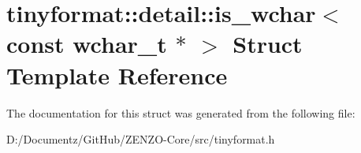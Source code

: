 \hypertarget{structtinyformat_1_1detail_1_1is__wchar_3_01const_01wchar__t_01_5_01_4}{}\section{tinyformat\+::detail\+::is\+\_\+wchar$<$ const wchar\+\_\+t $\ast$ $>$ Struct Template Reference}
\label{structtinyformat_1_1detail_1_1is__wchar_3_01const_01wchar__t_01_5_01_4}


The documentation for this struct was generated from the following file\+:\begin{DoxyCompactItemize}
\item 
D\+:/\+Documentz/\+Git\+Hub/\+Z\+E\+N\+Z\+O-\/\+Core/src/tinyformat.\+h\end{DoxyCompactItemize}
